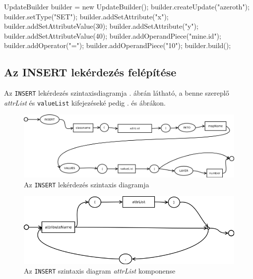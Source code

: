 \begin{java}
UpdateBuilder builder = new UpdateBuilder();
builder.createUpdate("azeroth");
builder.setType("SET");
builder.addSetAttribute("x");
builder.addSetAttributeValue(30);
builder.addSetAttribute("y");
builder.addSetAttributeValue(40);
builder.addOperandPiece("mine.id");
builder.addOperator("=");
builder.addOperandPiece("10");
builder.build();
\end{java}

\subsection{Az INSERT lekérdezés felépítése}

Az \texttt{INSERT} lekérdezés szintaxisdiagramja . ábrán látható, a benne szereplő \textit{attrList} és \texttt{valueList} kifejezéseké pedig . és  ábrákon.

\begin{figure}[htb]
	\begin{center}
		\includegraphics[scale=0.4]{images/insert}
		\caption{Az \texttt{INSERT} lekérdezés szintaxis diagramja}
		\label{fig:insertSytnax}
	\end{center}
\end{figure}

\begin{figure}[htb]
	\begin{center}
		\includegraphics[scale=0.4]{images/attrList}
		\caption{Az \texttt{INSERT} szintaxis diagram \textit{attrList} komponense}
		\label{fig:attrListSytnax}
	\end{center}
\end{figure}

